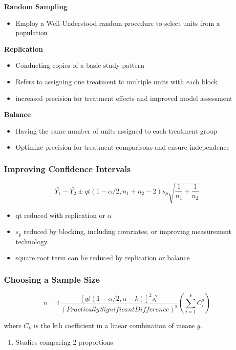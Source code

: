\documentclass[11pt]{article}
\begin{document}
\textbf{Random Sampling}
\begin{itemize}
\item Employ a Well-Understood random procedure to select units from a population
\end{itemize}

\textbf{Replication}
\begin{itemize}
\item Conducting copies of a basic study pattern
\item Refers to assigning one treatment to multiple units with each block
\item increased precision for treatment effects and improved model assessment
\end{itemize}

\textbf{Balance}
\begin{itemize}
\item Having the same number of units assigned to each treatment group
\item Optimize precision for treatment comparisons and ensure independence
\end{itemize}

\subsubsection{Improving Confidence Intervals}
\label{sec:org1fab148}
$$
    \bar{Y_1} - \bar{Y_2} \pm qt(1 - \alpha/2, n_1 + n_2 - 2)s_p\sqrt{\frac{1}{n_1} + \frac{1}{n_2}}
$$

\begin{itemize}
\item qt reduced with replication or \(\alpha\)
\item \(s_p\) reduced by blocking, including covariates, or improving
measurement technology
\item square root term can be reduced by replication or balance
\end{itemize}

\subsubsection{Choosing a Sample Size}
\label{sec:orgf237809}
$$
    n = 4 \frac{[qt(1 - \alpha/2, n - k)]^2 s_\epsilon^2}{({Practically Significant Difference})^2} (\sum_{i = 1}^k C_i^2)
$$

where \(C_k\) is the kth coefficient in a linear combination of means \(g\).

\begin{enumerate}
\item Studies comparing 2 proportions
\label{sec:org5bef613}
\end{enumerate}
\end{document}

